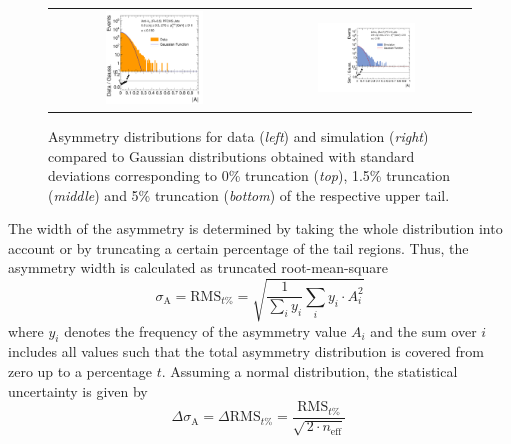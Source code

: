 \begin{figure}[!htp]
\begin{tabular}{cc}
                \includegraphics[width=0.49\textwidth]{figures/AsymmHistosDataWithRatio_Eta0_pt5_alpha2_final_nominal_95Truncation_v4.pdf} &
                \includegraphics[width=0.49\textwidth]{figures/AsymmHistosSimWithRatio_Eta0_pt5_alpha2_final_nominal_95Truncation_v4b.pdf} \\
  \end{tabular}
  \caption{Asymmetry distributions for data (\textit{left}) and simulation (\textit{right}) compared to Gaussian distributions obtained with standard deviations corresponding to 0\% truncation (\textit{top}), 1.5\% truncation (\textit{middle}) and 5\% truncation (\textit{bottom}) of the respective upper tail.}
  \label{fig:asymm_width}
\end{figure}
The width of the asymmetry is determined by taking the whole distribution into account or by truncating a certain percentage of the tail regions. Thus, the asymmetry width is calculated as truncated root-mean-square
\begin{equation}
 \sigma_\mathrm{A} = \mathrm{RMS}_{t\%} = \sqrt{\frac{1}{\sum_{i} y_i} \sum_{i} y_i \cdot A_i^2}  
 \label{eq:truncated_rms}
\end{equation} 
where $y_i$ denotes the frequency of the asymmetry value $A_i$ and the sum over $i$ includes all values such that the total asymmetry distribution is covered from zero up to a percentage $t$. Assuming a normal distribution, the statistical uncertainty is given by
\begin{equation}
\Delta \sigma_\mathrm{A} = \Delta \mathrm{RMS}_{t\%} = \frac{\mathrm{RMS}_{t\%}}{\sqrt{\, 2 \cdot n_\mathrm{eff}}} \,
\end{equation} 

